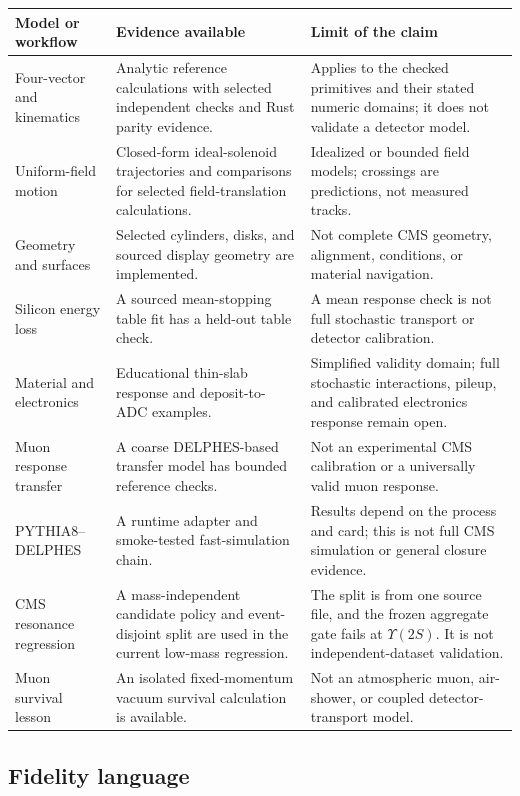 \documentclass[11pt,a4paper]{article}
\begin{document}
\begin{longtable}{P{0.24\textwidth} P{0.36\textwidth} P{0.32\textwidth}}
\toprule
\textbf{Model or workflow} & \textbf{Evidence available} & \textbf{Limit of the claim} \\
\midrule
\endhead
Four-vector and kinematics &
Analytic reference calculations with selected independent checks and Rust
parity evidence. &
Applies to the checked primitives and their stated numeric domains; it does not
validate a detector model. \\
Uniform-field motion &
Closed-form ideal-solenoid trajectories and comparisons for selected
field-translation calculations. &
Idealized or bounded field models; crossings are predictions, not measured
tracks. \\
Geometry and surfaces &
Selected cylinders, disks, and sourced display geometry are implemented. &
Not complete CMS geometry, alignment, conditions, or material navigation. \\
Silicon energy loss &
A sourced mean-stopping table fit has a held-out table check. &
A mean response check is not full stochastic transport or detector
calibration. \\
Material and electronics &
Educational thin-slab response and deposit-to-ADC examples. &
Simplified validity domain; full stochastic interactions, pileup, and calibrated
electronics response remain open. \\
Muon response transfer &
A coarse DELPHES-based transfer model has bounded reference checks. &
Not an experimental CMS calibration or a universally valid muon response. \\
PYTHIA8--DELPHES &
A runtime adapter and smoke-tested fast-simulation chain. &
Results depend on the process and card; this is not full CMS simulation or
general closure evidence. \\
CMS resonance regression &
A mass-independent candidate policy and event-disjoint split are used in the
current low-mass regression. &
The split is from one source file, and the frozen aggregate gate fails at
$\Upsilon(2S)$. It is not independent-dataset validation. \\
Muon survival lesson &
An isolated fixed-momentum vacuum survival calculation is available. &
Not an atmospheric muon, air-shower, or coupled detector-transport model. \\
\bottomrule
\end{longtable}

\subsection{Fidelity language}
\end{document}
